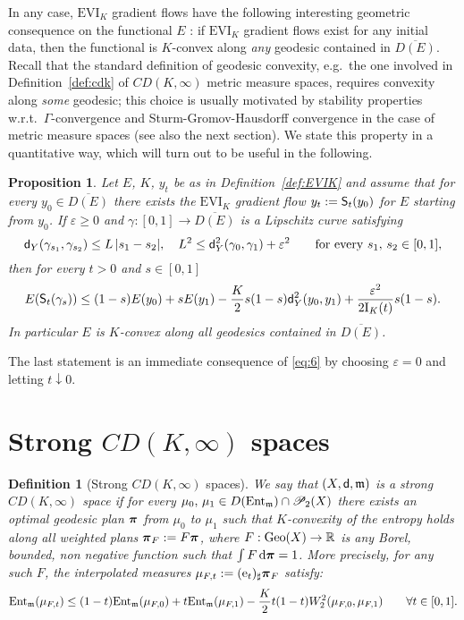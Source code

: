 \documentclass[reqno,11pt]{article}
\numberwithin{equation}{section}
\newcommand{\R}{\mathbb{R}}
\newcommand{\mm}{{\mbox{\boldmath$m$}}}
\newcommand{\ppi}{{\mbox{\boldmath$\pi$}}}
\newcommand{\sfd}{{\sf d}}
\newcommand{\sfS}{{\sf S}}
\renewcommand{\d}{{\mathrm d}}
\newcommand{\down}{\downarrow}              %
\newcommand{\eps}{\varepsilon}
\newcommand{\forevery}{\text{for every }}
\newcommand{\EVI}[4]{\mathrm{EVI}_{#4}(#1,{#2}_W,#3)}
\newcommand{\ProbabilitiesTwo}[1]{\mathscr P_2(#1)}     %
\newtheorem{proposition}[theorem]{Proposition}
\newtheorem{definition}[theorem]{Definition}
\newcommand{\entv}{{\rm Ent}_{\mm}}                    %
\newcommand{\probt}{\ProbabilitiesTwo}
\newcommand{\geo}{{\rm{Geo}}}                       %
\newcommand{\e}{{\rm{e}}}                           %
\newcommand{\entr}[2]{{\rm Ent}_{#2}(#1)}              %
\newcommand{\muF}[1]{\mu_{F,#1}}
\renewcommand{\EVI}{\ensuremath{\mathrm{EVI}}}
\renewcommand{\mm}{\mathfrak m}
\begin{document}
In any case, $\EVI_K$ gradient flows have the following interesting
geometric consequence on the functional $E$
\cite[Theorem~3.2]{Daneri-Savare08}: if $\EVI_K$ gradient flows
exist for any initial data, then the functional is $K$-convex along
\emph{any} geodesic contained in $\overline {D(E)}$. Recall that the
standard definition of geodesic convexity, e.g.~the one involved in
Definition~\ref{def:cdk} of $CD(K,\infty)$ metric measure spaces,
requires convexity along \emph{some} geodesic; this choice is
usually motivated by stability properties
w.r.t.~$\Gamma$-convergence
\cite[Thm.~9.1.4]{Ambrosio-Gigli-Savare08} and
Sturm-Gromov-Hausdorff convergence in the case of metric measure
spaces (see also the next section). We state this property in a
quantitative way, which will turn out to be useful in the following.
%
\begin{proposition}\label{prop:danerisavare}
Let $E$, $K$, $y_t$ be as in Definition~\ref{def:EVIK} and assume
that for every $y_0\in\overline{D(E)}$ there exists the $\EVI_K$
gradient flow $y_t:=\sfS_t(y_0)$ for $E$ starting from $y_0$. If
$\eps\ge0$ and $\gamma:[0,1]\to\overline{D(E)}$ is a Lipschitz curve
satisfying
\begin{equation}
  \label{eq:5}
  \sfd_Y(\gamma_{s_1},\gamma_{s_2})\le L\,|s_1-s_2|,\quad
  L^2\le \sfd^2_Y(\gamma_0,\gamma_1)+\eps^2\qquad\forevery s_1,\,s_2\in [0,1],
\end{equation}
then for every $t>0$ and $s\in [0,1]$
\begin{equation}
  \label{eq:6}
  E(\sfS_t(\gamma_s))\le (1-s)E(y_0)+sE(y_1)-\frac
  K2s(1-s)\sfd^2_Y(y_0,y_1)+\frac{\eps^2}{2\mathrm I_K(t)} s(1-s).
\end{equation}
In particular $E$ is $K$-convex along all geodesics contained in
$\overline{D(E)}$.
\end{proposition}

The last statement is an immediate consequence of \eqref{eq:6} by
choosing $\eps=0$ and letting $t\down0$.

\section{Strong $CD(K,\infty)$ spaces}\label{se:strongcd}
\begin{definition}[Strong $CD(K,\infty)$ spaces]\label{def:strongcd}
We say that $(X,\sfd,\mm)$ is a strong $CD(K,\infty)$ space if for
every $\mu_0,\,\mu_1\in D(\entv)\cap\probt{X}$ there exists an
optimal geodesic plan $\ppi$ from $\mu_0$ to $\mu_1$ such that
$K$-convexity of the entropy holds along all weighted plans
$\ppi_F:=F\ppi$, where $F:\geo(X)\to\R$ is any Borel, bounded, non
negative function such that $\int F\,\d\ppi=1$. More precisely, for
any such $F$, the interpolated measures $\muF
t:=(\e_t)_\sharp\ppi_F$ satisfy:
\[
\entr{\muF t }\mm\leq(1-t)\entr{\muF0}\mm +t\entr{\muF1}\mm-\frac K2
t(1-t)W_2^2(\muF0,\muF1)\qquad\forall t\in [0,1].
\]
\end{definition}
\end{document}
